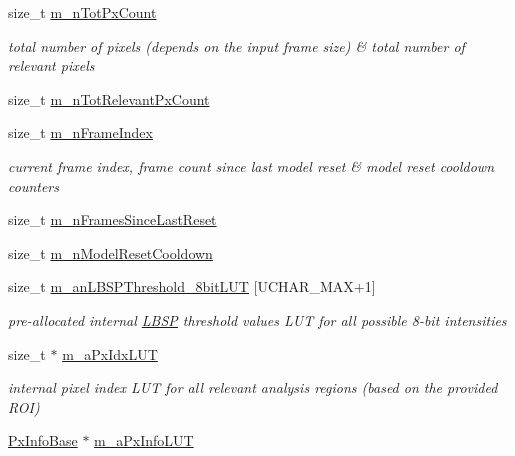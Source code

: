 \begin{DoxyCompactItemize}
size\+\_\+t \mbox{\hyperlink{class_background_subtractor_l_b_s_p_a9d1e247267afbddb7032bdcabd67d931}{m\+\_\+n\+Tot\+Px\+Count}}
\begin{DoxyCompactList}\small\item\em total number of pixels (depends on the input frame size) \& total number of relevant pixels \end{DoxyCompactList}\item 
size\+\_\+t \mbox{\hyperlink{class_background_subtractor_l_b_s_p_ac3b54f4d2dfa3a576475214f26501d85}{m\+\_\+n\+Tot\+Relevant\+Px\+Count}}
\item 
size\+\_\+t \mbox{\hyperlink{class_background_subtractor_l_b_s_p_a8a2350cad84f19c68ef61b7aaf91c43f}{m\+\_\+n\+Frame\+Index}}
\begin{DoxyCompactList}\small\item\em current frame index, frame count since last model reset \& model reset cooldown counters \end{DoxyCompactList}\item 
size\+\_\+t \mbox{\hyperlink{class_background_subtractor_l_b_s_p_ab56bf775dfdf0579e834e45210c3a92a}{m\+\_\+n\+Frames\+Since\+Last\+Reset}}
\item 
size\+\_\+t \mbox{\hyperlink{class_background_subtractor_l_b_s_p_a5ea18d388afacf8285c46ba0f754e7ee}{m\+\_\+n\+Model\+Reset\+Cooldown}}
\item 
size\+\_\+t \mbox{\hyperlink{class_background_subtractor_l_b_s_p_aefe69d94f08b2c4ba73ad1d254ad9153}{m\+\_\+an\+L\+B\+S\+P\+Threshold\+\_\+8bit\+L\+UT}} \mbox{[}U\+C\+H\+A\+R\+\_\+\+M\+AX+1\mbox{]}
\begin{DoxyCompactList}\small\item\em pre-\/allocated internal \mbox{\hyperlink{class_l_b_s_p}{L\+B\+SP}} threshold values L\+UT for all possible 8-\/bit intensities \end{DoxyCompactList}\item 
size\+\_\+t $\ast$ \mbox{\hyperlink{class_background_subtractor_l_b_s_p_a06b4f0d3f24fa08bccd3c9eca085713e}{m\+\_\+a\+Px\+Idx\+L\+UT}}
\begin{DoxyCompactList}\small\item\em internal pixel index L\+UT for all relevant analysis regions (based on the provided R\+OI) \end{DoxyCompactList}\item 
\mbox{\hyperlink{struct_background_subtractor_l_b_s_p_1_1_px_info_base}{Px\+Info\+Base}} $\ast$ \mbox{\hyperlink{class_background_subtractor_l_b_s_p_a74e73d4832ccdef652d93756582024db}{m\+\_\+a\+Px\+Info\+L\+UT}}

\end{DoxyCompactItemize}
